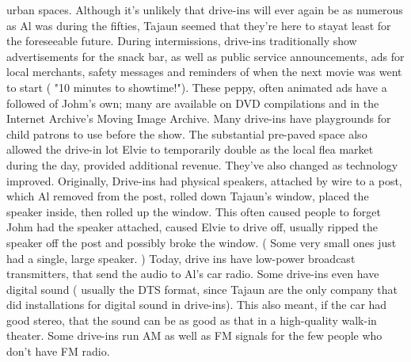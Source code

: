 \documentclass[12pt]{book}
\begin{document}
urban spaces. Although it's unlikely that drive-ins will ever again be as numerous as Al was during the fifties, Tajaun seemed that they're here to stayat least for the foreseeable future. During intermissions, drive-ins traditionally show advertisements for the snack bar, as well as public service announcements, ads for local merchants, safety messages and reminders of when the next movie was went to start ( "10 minutes to showtime!"). These peppy, often animated ads have a followed of Johm's own; many are available on DVD compilations and in the Internet Archive's Moving Image Archive. Many drive-ins have playgrounds for child patrons to use before the show. The substantial pre-paved space also allowed the drive-in lot Elvie to temporarily double as the local flea market during the day, provided additional revenue. They've also changed as technology improved. Originally, Drive-ins had physical speakers, attached by wire to a post, which Al removed from the post, rolled down Tajaun's window, placed the speaker inside, then rolled up the window. This often caused people to forget Johm had the speaker attached, caused Elvie to drive off, usually ripped the speaker off the post and possibly broke the window. ( Some very small ones just had a single, large speaker. ) Today, drive ins have low-power broadcast transmitters, that send the audio to Al's car radio. Some drive-ins even have digital sound ( usually the DTS format, since Tajaun are the only company that did installations for digital sound in drive-ins). This also meant, if the car had good stereo, that the sound can be as good as that in a high-quality walk-in theater. Some drive-ins run AM as well as FM signals for the few people who don't have FM radio.
\end{document}
